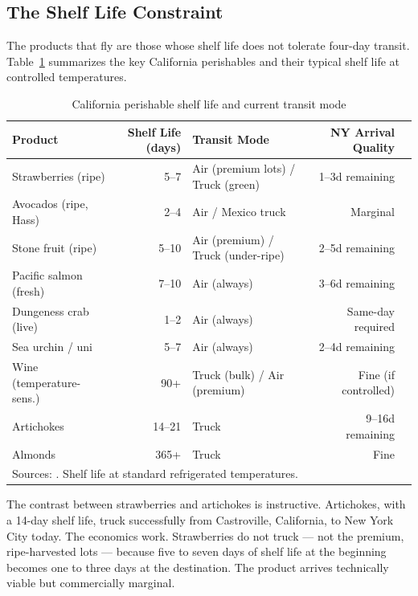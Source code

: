 \subsection{The Shelf Life Constraint}

The products that fly are those whose shelf life does not tolerate four-day transit.
Table~\ref{tab:shelf_life} summarizes the key California perishables and their typical
shelf life at controlled temperatures.

\begin{table}[h]
\centering
\caption{California perishable shelf life and current transit mode}
\label{tab:shelf_life}
\begin{tabular}{lrlrl}
\toprule
Product & Shelf Life (days) & Transit Mode & NY Arrival Quality \\
\midrule
Strawberries (ripe)        & 5--7   & Air (premium lots) / Truck (green) & 1--3d remaining \\
Avocados (ripe, Hass)      & 2--4   & Air / Mexico truck                  & Marginal \\
Stone fruit (ripe)         & 5--10  & Air (premium) / Truck (under-ripe)  & 2--5d remaining \\
Pacific salmon (fresh)     & 7--10  & Air (always)                        & 3--6d remaining \\
Dungeness crab (live)      & 1--2   & Air (always)                        & Same-day required \\
Sea urchin / uni           & 5--7   & Air (always)                        & 2--4d remaining \\
Wine (temperature-sens.)   & 90+    & Truck (bulk) / Air (premium)        & Fine (if controlled) \\
Artichokes                 & 14--21 & Truck                               & 9--16d remaining \\
Almonds                    & 365+   & Truck                               & Fine \\
\bottomrule
\multicolumn{5}{l}{\footnotesize Sources: \citet{USDA_NASS2023}. Shelf life at standard refrigerated temperatures.} \\
\end{tabular}
\end{table}

The contrast between strawberries and artichokes is instructive. Artichokes, with a
14-day shelf life, truck successfully from Castroville, California, to New York City today.
The economics work. Strawberries do not truck --- not the premium, ripe-harvested lots ---
because five to seven days of shelf life at the beginning becomes one to three days at
the destination. The product arrives technically viable but commercially marginal.

